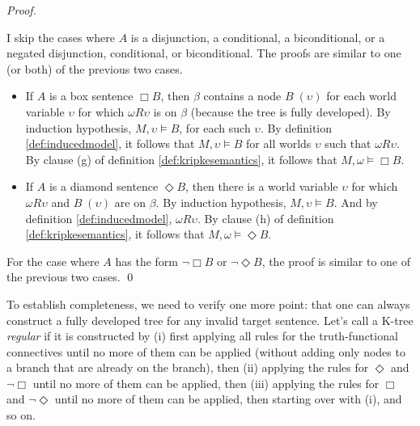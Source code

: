 \begin{proof}
\begin{itemize}
  \end{itemize} 
  
  I skip the cases where $A$ is a disjunction, a conditional, a
  biconditional, or a negated disjunction, conditional, or biconditional. The
  proofs are similar to one (or both) of the previous two cases.

  \begin{itemize}
    
    \item If $A$ is a box sentence $\Box B$, then $\beta$ contains a node
          $B \;(\upsilon)$ for each world variable $\upsilon$ for which
          $\omega R \upsilon$ is on $\beta$ (because the tree is fully
          developed). By induction hypothesis, $M, \upsilon \models B$, for each
          such $\upsilon$. By definition \ref{def:inducedmodel}, it follows that
          $M,\upsilon \models B$ for all worlds $\upsilon$ such that
          $\omega R \upsilon$. By clause (g) of definition
          \ref{def:kripkesemantics}, it follows that $M, \omega \models \Box B$.
    
    \item If $A$ is a diamond sentence $\Diamond B$, then there is a world
          variable $\upsilon$ for which $\omega R \upsilon$ and $B \;(\upsilon)$
          are on $\beta$. By induction hypothesis, $M, \upsilon \models B$. And
          by definition \ref{def:inducedmodel}, $\omega R\upsilon$. By clause
          (h) of definition \ref{def:kripkesemantics}, it follows that
          $M, \omega \models \Diamond B$.

  \end{itemize}

  For the case where $A$ has the form $\neg \Box B$ or $\neg \Diamond B$, the
  proof is similar to one of the previous two cases. \qed
  
\end{proof}
\medskip

To establish completeness, we need to verify one more point: that one can always
construct a fully developed tree for any invalid target sentence. Let's call a
K-tree \emph{regular} if it is constructed by (i) first applying all rules for
the truth-functional connectives until no more of them can be applied (without
adding only nodes to a branch that are already on the branch), then (ii)
applying the rules for $\Diamond$ and $\neg \Box$ until no more of them can be
applied, then (iii) applying the rules for $\Box$ and $\neg \Diamond$ until no
more of them can be applied, then starting over with (i), and so on.

